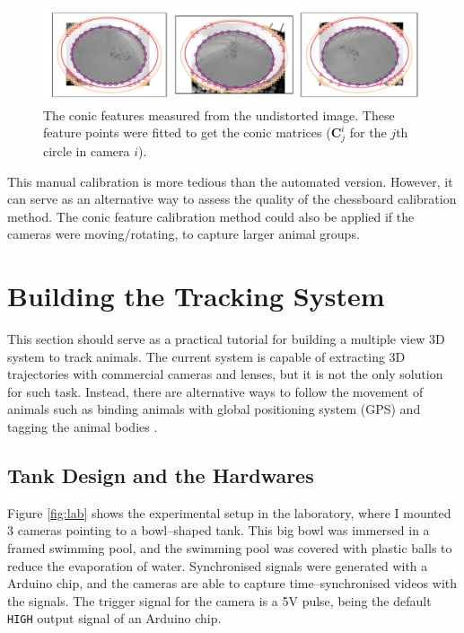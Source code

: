 \documentclass[11pt,twoside]{report}
\begin{document}
\begin{figure}
  \includegraphics[width=1\linewidth,outer]{conics-measure}
  \caption{The conic features measured from the undistorted image. These feature points were fitted to get the conic matrices ($\mathbf{C}_{j}^{i}$ for the $j$th circle in camera $i$).}
  \label{fig:conic_measure}
\end{figure}


This manual calibration is more tedious than the automated version. However, it can serve as an alternative way to assess the quality of the chessboard calibration method. The conic feature calibration method could also be applied if the cameras were moving/rotating, to capture larger animal groups.


\section{Building the Tracking System}

This section should serve as a practical tutorial for building a multiple view 3D system to track animals. The current system is capable of extracting 3D trajectories with commercial cameras and lenses, but it is not the only solution for such task. Instead, there are alternative ways to follow the movement of animals such as binding animals with global positioning system (GPS) \cite{nagy2010} and tagging the animal bodies \cite{jolles2017}.

\subsection{Tank Design and the Hardwares}

Figure \ref{fig:lab} shows the experimental setup in the laboratory, where I mounted 3 cameras pointing to a bowl--shaped tank. This big bowl was immersed in a framed swimming pool, and the swimming pool was covered with plastic balls to reduce the evaporation of water. Synchronised signals were generated with a Arduino chip, and the cameras are able to capture time--synchronised videos with the signals. The trigger signal for the camera is a 5V pulse, being the default \texttt{HIGH} output signal of an Arduino chip.
\end{document}
